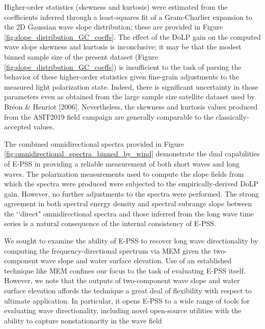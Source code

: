 \documentclass[letterpaper,journal]{IEEEtran}
\begin{document}
Higher-order statistics (skewness and kurtosis) were estimated from the coefficients inferred through a least-squares fit of a Gram-Charlier expansion to the 2D Gaussian wave slope distribution; these are provided in Figure \ref{fig:slope_distribution_GC_coeffs}. The effect of the DoLP gain on the computed wave slope skewness and kurtosis is inconclusive; it may be that the modest binned sample size of the present dataset (Figure \ref{fig:slope_distribution_GC_coeffs}) is insufficient to the task of parsing the behavior of these higher-order statistics given fine-grain adjustments to the measured light polarization state. Indeed, there is significant uncertainty in those parameters even as obtained from the large sample size satellite dataset used by Br\'eon \& Henriot [2006]. Nevertheless, the skewness and kurtosis values produced from the ASIT2019 field campaign are generally comparable to the classically-accepted values.

The combined omnidirectional spectra provided in Figure \ref{fig:omnidirectional_spectra_binned_by_wind} demonstrate the dual capabilities of E-PSS in providing a reliable measurement of both short waves and long waves. The polarization measurements used to compute the slope fields from which the spectra were produced were subjected to the empirically-derived DoLP gain. However, no further adjustments to the spectra were performed. The strong agreement in both spectral energy density and spectral subrange slope between the \lq\lq direct" omnidirectional spectra and those inferred from the long wave time series is a natural consequence of the internal consistency of E-PSS.

We sought to examine the ability of E-PSS to recover long wave directionality by computing the frequency-directional spectrum via MEM \cite{lygre_maximum_1986} given the two-component wave slope and water surface elevation. Use of an established technique like MEM confines our focus to the task of evaluating E-PSS itself. However, we note that the outputs of two-component wave slope and water surface elevation affords the technique a great deal of flexibility with respect to ultimate application. In particular, it opens E-PSS to a wide range of tools for evaluating wave directionality, including novel open-source utilities with the ability to capture nonstationarity in the wave field \cite{pelaez-zapata_ocean_2024,pelaez-zapata_ewdm_2025}
\end{document}
